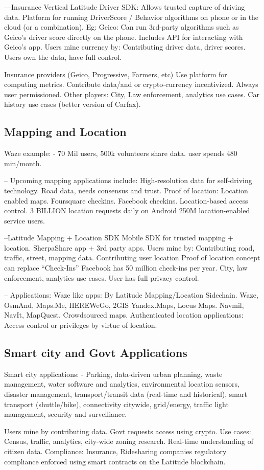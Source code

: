  ---Insurance Vertical
 Latitude Driver SDK:
 Allows trusted capture of driving data.
 Platform for running DriverScore / Behavior algorithms on phone or in the cloud (or a combination). 
 Eg: Geico:
 Can run 3rd-party algorithms such as Geico’s driver score directly on the phone.
 Includes API for interacting with Geico’s app.
 Users mine currency by:
 Contributing driver data, driver scores.
 Users own the data, have full control.

 Insurance providers (Geico, Progressive, Farmers, etc)
 Use platform for computing metrics.
 Contribute data/and or crypto-currency incentivized.
 Always user permissioned.
 Other players:
 City, Law enforcement, analytics use cases.
 Car history use cases (better version of Carfax).


\subsection{Mapping and Location}

Waze example:
 - 70 Mil users, 500k volunteers share data. user spends 480 min/month.

-- Upcoming mapping applications include:
 High-resolution data for self-driving technology.
 Road data, needs consensus and trust.
 Proof of location:
 Location enabled maps. 
 Foursquare checkins. Facebook checkins.
 Location-based access control.
 3 BILLION location requests daily on Android
 250M location-enabled service users.

--Latitude Mapping + Location SDK
Mobile SDK for trusted mapping + location.
SherpaShare app + 3rd party apps.
Users mine by:
Contributing road, traffic, street, mapping data.
Contributing user location
Proof of location concept can replace “Check-Ins”
Facebook has 50 million check-ins per year.
City, law enforcement, analytics use cases.
User has full privacy control.

-- Applications:
Waze like apps:
By Latitude Mapping/Location Sidechain.
Waze, OsmAnd, Maps.Me, HEREWeGo, 2GIS
Yandex.Maps, Locus Maps.
 Navmil, NavIt, MapQuest.
 Crowdsourced maps.
 Authenticated location applications:
 Access control or privileges by virtue of location.

\subsection{Smart city and Govt Applications}

Smart city applications:
 - Parking, data-driven urban planning, waste management, water software and analytics, environmental location sensors,
   disaster management, transport/transit data (real-time and historical), smart transport (shuttle/bike),
   connectivity citywide, grid/energy, traffic light management, security and survelliance.

  Users mine by contributing data.
  Govt requests access using crypto.
  Use cases:
  Census, traffic, analytics, city-wide zoning research.
  Real-time understanding of citizen data.
  Compliance:
  Insurance, Ridesharing companies regulatory compliance enforced using smart contracts on the Latitude blockchain.
